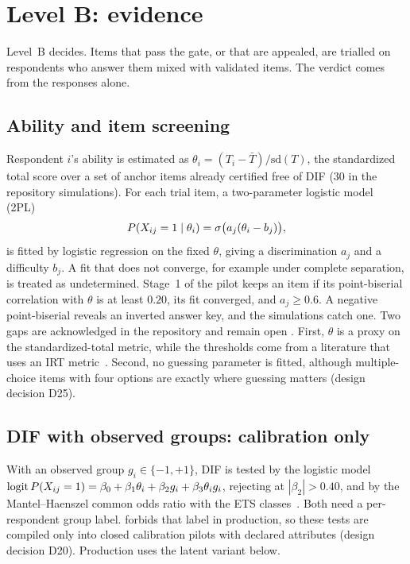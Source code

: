 \section{Level B: evidence}\label{sec:levelb}

Level~B decides. Items that pass the gate, or that are appealed, are trialled on respondents
who answer them mixed with validated items. The verdict comes from the responses alone.

\subsection{Ability and item screening}

Respondent $i$'s ability is estimated as $\theta_i=(T_i-\bar T)/\mathrm{sd}(T)$, the
standardized total score over a set of anchor items already certified free of DIF (30 in the
repository simulations). For each trial item, a two-parameter logistic model
(2PL)~\cite{birnbaum1968,lord1980}
\begin{equation}\label{eq:2pl}
  P(X_{ij}=1\mid\theta_i)=\sigma\bigl(a_j(\theta_i-b_j)\bigr),
\end{equation}
is fitted by logistic regression on the fixed $\theta$, giving a discrimination $a_j$ and a
difficulty $b_j$. A fit that does not converge, for example under complete separation, is
treated as undetermined. Stage~1 of the pilot keeps an item if its point-biserial correlation
with $\theta$ is at least $0.20$, its fit converged, and $a_j\ge0.6$. A negative point-biserial
reveals an inverted answer key, and the simulations catch one. Two gaps are acknowledged in the
repository and remain open \openq. First, $\theta$ is a proxy on the standardized-total metric,
while the thresholds come from a literature that uses an IRT metric~\cite{hambleton1991}.
Second, no guessing parameter is fitted, although multiple-choice items with four options are
exactly where guessing matters (design decision D25).

\subsection{DIF with observed groups: calibration only}

With an observed group $g_i\in\{-1,+1\}$, DIF is tested by the logistic
model~\cite{swaminathan1990}
$\operatorname{logit} P(X_{ij}=1)=\beta_0+\beta_1\theta_i+\beta_2g_i+\beta_3\theta_ig_i$, rejecting at
$|\beta_2|>0.40$, and by the Mantel--Haenszel common odds ratio with the ETS
classes~\cite{mantel1959,holland1988mh,zieky1993}. Both need a per-respondent group label.
 forbids that label in production, so these tests are compiled only into closed
calibration pilots with declared attributes (design decision D20). Production uses the latent
variant below.

